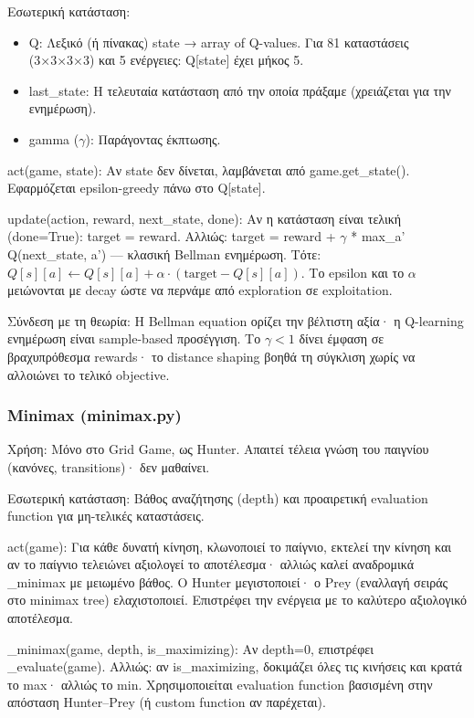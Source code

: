 \documentclass[11pt,a4paper]{article}
\newcommand{\eng}[1]{\foreignlanguage{english}{#1}}
\begin{document}
Εσωτερική κατάσταση:

\begin{itemize}
\item \eng{Q}: Λεξικό (ή πίνακας) state → array of Q-values. Για 81 καταστάσεις (3×3×3×3) και 5 ενέργειες: Q[state] έχει μήκος 5.
\item \eng{last\_state}: Η τελευταία κατάσταση από την οποία πράξαμε (χρειάζεται για την ενημέρωση).
\item \eng{gamma} (\(\gamma\)): Παράγοντας έκπτωσης.
\end{itemize}

\eng{act(game, state)}: Αν state δεν δίνεται, λαμβάνεται από game.get\_state(). Εφαρμόζεται epsilon-greedy πάνω στο Q[state].

\eng{update(action, reward, next\_state, done)}: Αν η κατάσταση είναι τελική (done=True): target = reward. Αλλιώς: target = reward + \(\gamma\) * max\_a' Q(next\_state, a') — κλασική Bellman ενημέρωση. Τότε:
\(Q[s][a] \leftarrow Q[s][a] + \alpha \cdot (\mathrm{target} - Q[s][a])\).
Το epsilon και το \(\alpha\) μειώνονται με decay ώστε να περνάμε από exploration σε exploitation.

Σύνδεση με τη θεωρία: Η Bellman equation ορίζει την βέλτιστη αξία· η Q-learning ενημέρωση είναι sample-based προσέγγιση. Το \(\gamma<1\) δίνει έμφαση σε βραχυπρόθεσμα rewards· το distance shaping βοηθά τη σύγκλιση χωρίς να αλλοιώνει το τελικό objective.

\subsubsection{Minimax (\eng{minimax.py})}

Χρήση: Μόνο στο Grid Game, ως Hunter. Απαιτεί τέλεια γνώση του παιγνίου (κανόνες, transitions)· δεν μαθαίνει.

Εσωτερική κατάσταση: Βάθος αναζήτησης (depth) και προαιρετική evaluation function για μη-τελικές καταστάσεις.

\eng{act(game)}: Για κάθε δυνατή κίνηση, κλωνοποιεί το παίγνιο, εκτελεί την κίνηση και αν το παίγνιο τελειώνει αξιολογεί το αποτέλεσμα· αλλιώς καλεί αναδρομικά \_minimax με μειωμένο βάθος. Ο Hunter μεγιστοποιεί· ο Prey (εναλλαγή σειράς στο minimax tree) ελαχιστοποιεί. Επιστρέφει την ενέργεια με το καλύτερο αξιολογικό αποτέλεσμα.

\eng{\_minimax(game, depth, is\_maximizing)}: Αν depth=0, επιστρέφει \_evaluate(game). Αλλιώς: αν is\_maximizing, δοκιμάζει όλες τις κινήσεις και κρατά το max· αλλιώς το min. Χρησιμοποιείται evaluation function βασισμένη στην απόσταση Hunter–Prey (ή custom function αν παρέχεται).
\end{document}
